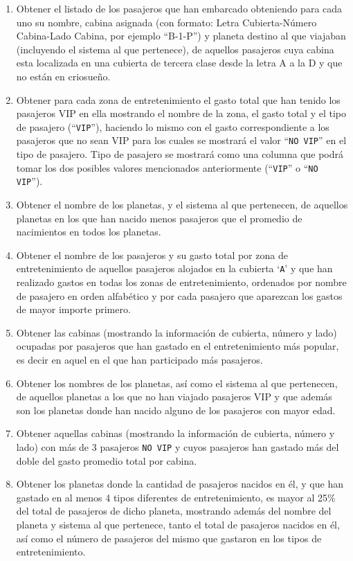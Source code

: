 \documentclass{db-practice}
\begin{document}
\begin{enumerate}
    \item Obtener el listado de los pasajeros que han embarcado obteniendo para cada uno su nombre, cabina asignada (con formato: Letra Cubierta-Número Cabina-Lado Cabina, por ejemplo ``B-1-P'') y planeta destino al que viajaban (incluyendo el sistema al que pertenece), de aquellos pasajeros cuya cabina esta localizada en una cubierta de tercera clase desde la letra A a la D y que no están en criosueño.
    \item Obtener para cada zona de entretenimiento el gasto total que han tenido los pasajeros VIP en ella mostrando el nombre de la zona, el gasto total y el tipo de pasajero (``\texttt{VIP}''), haciendo lo mismo con el gasto correspondiente a los pasajeros que no sean VIP para los cuales se mostrará el valor ``\texttt{NO VIP}'' en el tipo de pasajero. Tipo de pasajero se mostrará como una columna que podrá tomar los dos posibles valores mencionados anteriormente (``\texttt{VIP}'' o ``\texttt{NO VIP}'').
    \item Obtener el nombre de los planetas, y el sistema al que pertenecen, de aquellos planetas en los que han nacido menos pasajeros que el promedio de nacimientos en todos los planetas.
    \item Obtener el nombre de los pasajeros y su gasto total por zona de entretenimiento de aquellos pasajeros alojados en la cubierta `\texttt{A}' y que han realizado gastos en todas los zonas de entretenimiento, ordenados por nombre de pasajero en orden alfabético y por cada pasajero que aparezcan los gastos de mayor importe primero.
    \item Obtener las cabinas (mostrando la información de cubierta, número y lado) ocupadas por pasajeros que han gastado en el entretenimiento más popular, es decir en aquel en el que han participado más pasajeros.
    \item Obtener los nombres de los planetas, así como el sistema al que pertenecen, de aquellos planetas a los que no han viajado pasajeros VIP y que además son los planetas donde han nacido alguno de los pasajeros con mayor edad.
    \item Obtener aquellas cabinas (mostrando la información de cubierta, número y lado) con más de 3 pasajeros \texttt{NO VIP} y cuyos pasajeros han gastado más del doble del gasto promedio total por cabina.
    \item Obtener los planetas donde la cantidad de pasajeros nacidos en él, y que han gastado en al menos 4 tipos diferentes de entretenimiento, es mayor al 25\% del total de pasajeros de dicho planeta, mostrando además del nombre del planeta y sistema al que pertenece, tanto el total de pasajeros nacidos en él, así como el número de pasajeros del mismo que gastaron en los tipos de entretenimiento.

\end{enumerate}
\end{document}
